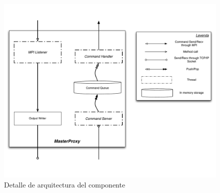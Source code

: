 \begin{figure}
\centering
\label{fig:masterproxydetail}
\includegraphics[scale=0.3]{graphs/master proxy detail}
\caption{Detalle de arquitectura del componente \master}
\end{figure}


\subsection{\fend}

